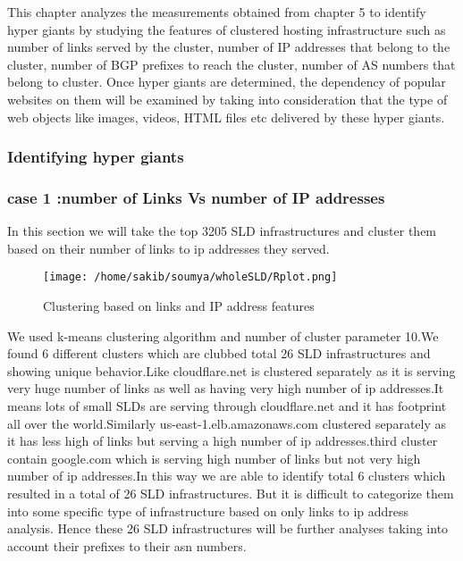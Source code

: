 This chapter analyzes the measurements obtained from chapter 5 to identify hyper giants by studying the features of clustered hosting infrastructure such as number of links served by the cluster, number of IP addresses that belong to the cluster, number of BGP prefixes to reach the cluster, number of AS numbers that belong to cluster. Once hyper giants are determined, the dependency of popular websites on them will be examined by taking into consideration that the type of web objects like images, videos, HTML files etc delivered by these hyper giants. 

\subsubsection{Identifying hyper giants}

\subsubsection{case 1 :number of Links Vs number of IP addresses}
In this section we will take the top 3205 SLD infrastructures and cluster them based on their number of links to ip addresses they served.

\begin{figure}[h]
\texttt{[image: /home/sakib/soumya/wholeSLD/Rplot.png]}
\centering
\caption{Clustering based on links and IP address features}
\end{figure}

We used k-means clustering algorithm and number of cluster parameter 10.We found 6 different clusters which are clubbed total 26 SLD infrastructures and showing unique behavior.Like cloudflare.net is clustered separately as it is serving very huge number of links as well as having very high number of ip addresses.It means lots of small SLDs are serving through cloudflare.net and it has footprint all over the world.Similarly us-east-1.elb.amazonaws.com clustered separately as it has less high of links but serving a high number of ip addresses.third cluster contain google.com which is serving high number of links but not very high number of ip addresses.In this way we are able to identify total 6 clusters which resulted in a total of 26 SLD infrastructures. But it is difficult to categorize them into some specific type of infrastructure based on only  links to ip address analysis. Hence these 26 SLD infrastructures will be further analyses taking into account their prefixes to their asn numbers.

